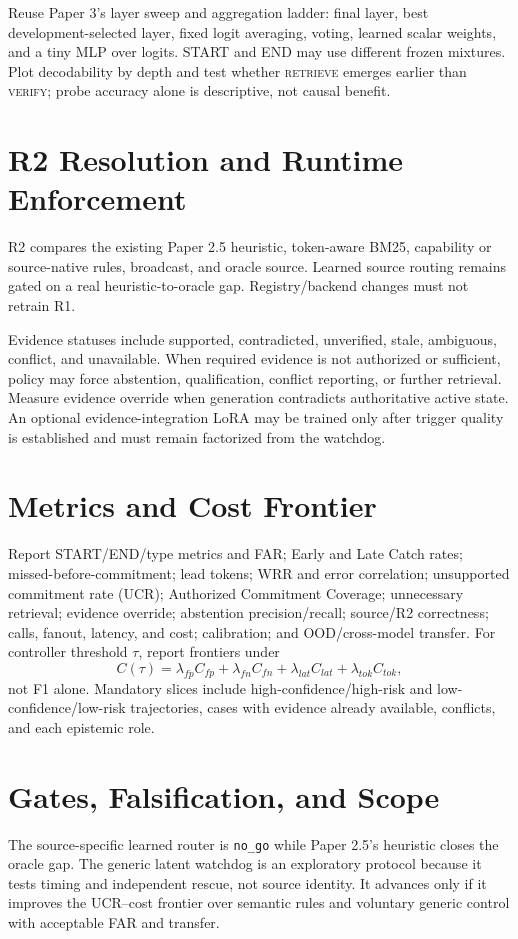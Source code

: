 \documentclass[10pt]{article}
\begin{document}
Reuse Paper 3's layer sweep and aggregation ladder: final layer, best
development-selected layer, fixed logit averaging, voting, learned scalar
weights, and a tiny MLP over logits. START and END may use different frozen
mixtures. Plot decodability by depth and test whether \textsc{retrieve} emerges
earlier than \textsc{verify}; probe accuracy alone is descriptive, not causal
benefit.

\section{R2 Resolution and Runtime Enforcement}
R2 compares the existing Paper 2.5 heuristic, token-aware BM25, capability or
source-native rules, broadcast, and oracle source. Learned source routing
remains gated on a real heuristic-to-oracle gap. Registry/backend changes must
not retrain R1.

Evidence statuses include supported, contradicted, unverified, stale,
ambiguous, conflict, and unavailable. When required evidence is not authorized
or sufficient, policy may force abstention, qualification, conflict reporting,
or further retrieval. Measure evidence override when generation contradicts
authoritative active state. An optional evidence-integration LoRA may be trained
only after trigger quality is established and must remain factorized from the
watchdog.

\section{Metrics and Cost Frontier}
Report START/END/type metrics and FAR; Early and Late Catch rates;
missed-before-commitment; lead tokens; WRR and error correlation; unsupported
commitment rate (UCR); Authorized Commitment Coverage; unnecessary retrieval;
evidence override; abstention precision/recall; source/R2 correctness; calls,
fanout, latency, and cost; calibration; and OOD/cross-model transfer. For
controller threshold $\tau$, report frontiers under
\[
C(\tau)=\lambda_{fp}C_{fp}+\lambda_{fn}C_{fn}
+\lambda_{lat}C_{lat}+\lambda_{tok}C_{tok},
\]
not F1 alone. Mandatory slices include high-confidence/high-risk and
low-confidence/low-risk trajectories, cases with evidence already available,
conflicts, and each epistemic role.

\section{Gates, Falsification, and Scope}
The source-specific learned router is \texttt{no\_go} while Paper 2.5's
heuristic closes the oracle gap. The generic latent watchdog is an exploratory
protocol because it tests timing and independent rescue, not source identity.
It advances only if it improves the UCR--cost frontier over semantic rules and
voluntary generic control with acceptable FAR and transfer.
\end{document}
